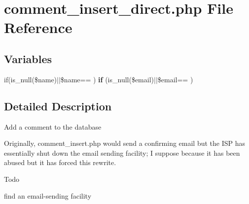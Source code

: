 \section{comment\+\_\+insert\+\_\+direct.\+php File Reference}
\label{comment__insert__direct_8php}
\subsection*{Variables}
\begin{DoxyCompactItemize}
\item 
if(is\+\_\+null(\$name)$\vert$$\vert$\$name== \textquotesingle{}\textquotesingle{}) {\bfseries if} (is\+\_\+null(\$email)$\vert$$\vert$\$email== \textquotesingle{}\textquotesingle{})\label{comment__insert__direct_8php_a14ae71e0524e70b5d948824e50d004c7}

\end{DoxyCompactItemize}


\subsection{Detailed Description}
Add a comment to the database

Originally, comment\+\_\+insert.\+php would send a confirming email but the I\+SP has essentially shut down the email sending facility; I suppose because it has been abused but it has forced this rewrite.

\begin{DoxyRefDesc}{Todo}
\item[{\bf Todo}]find an email-\/sending facility \end{DoxyRefDesc}
